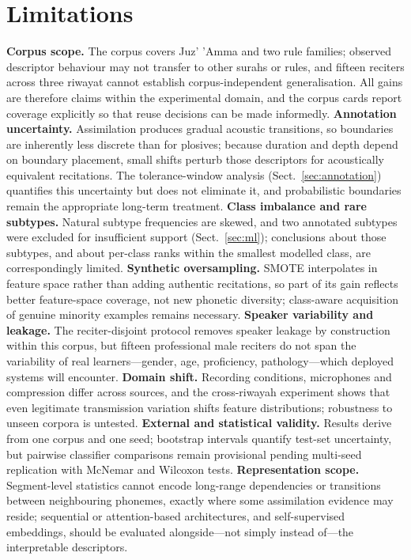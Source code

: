 \documentclass[runningheads]{llncs}
\begin{document}
\section{Limitations}
\label{sec:limitations}

\textbf{Corpus scope.} The corpus covers Juz' 'Amma and two rule families;
observed descriptor behaviour may not transfer to other surahs or rules, and
fifteen reciters across three riwayat cannot establish corpus-independent
generalisation. All gains are therefore claims within the experimental domain,
and the corpus cards report coverage explicitly so that reuse decisions can be
made informedly.
\textbf{Annotation uncertainty.} Assimilation produces gradual acoustic
transitions, so boundaries are inherently less discrete than for plosives;
because duration and depth depend on boundary placement, small shifts perturb
those descriptors for acoustically equivalent recitations. The tolerance-window
analysis (Sect.~\ref{sec:annotation}) quantifies this uncertainty but does not
eliminate it, and probabilistic boundaries remain the appropriate long-term
treatment.
\textbf{Class imbalance and rare subtypes.} Natural subtype frequencies are
skewed, and two annotated subtypes were excluded for insufficient support
(Sect.~\ref{sec:ml}); conclusions about those subtypes, and about per-class
ranks within the smallest modelled class, are correspondingly limited.
\textbf{Synthetic oversampling.} SMOTE interpolates in feature space rather
than adding authentic recitations, so part of its gain reflects better
feature-space coverage, not new phonetic diversity; class-aware acquisition of
genuine minority examples remains necessary.
\textbf{Speaker variability and leakage.} The reciter-disjoint protocol removes
speaker leakage by construction within this corpus, but fifteen professional
male reciters do not span the variability of real learners---gender, age,
proficiency, pathology---which deployed systems will encounter.
\textbf{Domain shift.} Recording conditions, microphones and compression differ
across sources, and the cross-riwayah experiment shows that even legitimate
transmission variation shifts feature distributions; robustness to unseen
corpora is untested.
\textbf{External and statistical validity.} Results derive from one corpus and
one seed; bootstrap intervals quantify test-set uncertainty, but pairwise
classifier comparisons remain provisional pending multi-seed replication with
McNemar and Wilcoxon tests.
\textbf{Representation scope.} Segment-level statistics cannot encode long-range
dependencies or transitions between neighbouring phonemes, exactly where some
assimilation evidence may reside; sequential or attention-based architectures,
and self-supervised embeddings, should be evaluated alongside---not simply
instead of---the interpretable descriptors.
\end{document}
